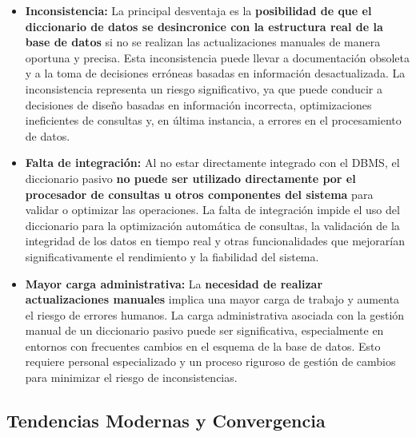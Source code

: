 \begin{itemize}
    \item \textbf{Inconsistencia:} La principal desventaja es la \textbf{posibilidad de que el diccionario de datos se desincronice con la estructura real de la base de datos} si no se realizan las actualizaciones manuales de manera oportuna y precisa. Esta inconsistencia puede llevar a documentación obsoleta y a la toma de decisiones erróneas basadas en información desactualizada.  La inconsistencia representa un riesgo significativo, ya que puede conducir a decisiones de diseño basadas en información incorrecta, optimizaciones ineficientes de consultas y, en última instancia, a errores en el procesamiento de datos.
    \item \textbf{Falta de integración:} Al no estar directamente integrado con el DBMS, el diccionario pasivo \textbf{no puede ser utilizado directamente por el procesador de consultas u otros componentes del sistema} para validar o optimizar las operaciones.  La falta de integración impide el uso del diccionario para la optimización automática de consultas, la validación de la integridad de los datos en tiempo real y otras funcionalidades que mejorarían significativamente el rendimiento y la fiabilidad del sistema.
    \item \textbf{Mayor carga administrativa:} La \textbf{necesidad de realizar actualizaciones manuales} implica una mayor carga de trabajo y aumenta el riesgo de errores humanos. La carga administrativa asociada con la gestión manual de un diccionario pasivo puede ser significativa, especialmente en entornos con frecuentes cambios en el esquema de la base de datos. Esto requiere personal especializado y un proceso riguroso de gestión de cambios para minimizar el riesgo de inconsistencias.
\end{itemize}

\subsection{Tendencias Modernas y Convergencia}

